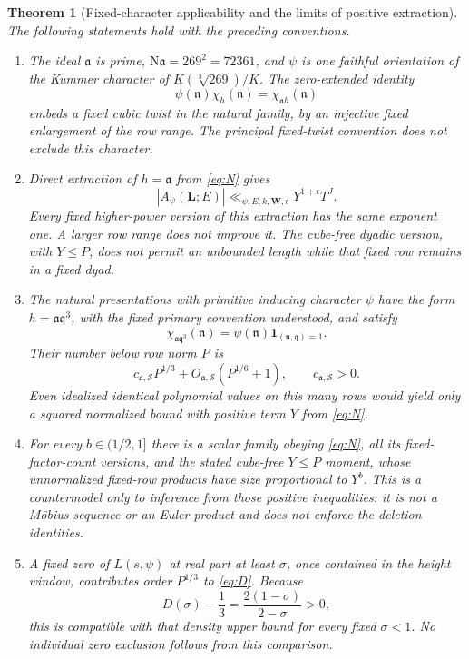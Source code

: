 \documentclass[11pt]{article}
\newtheorem{theorem}{Theorem}[section]
\theoremstyle{remark}\newtheorem{remark}[theorem]{Remark}
\newcommand{\N}{\mathrm N}
\begin{document}
\begin{theorem}[Fixed-character applicability and the limits of positive extraction]\label{thm:fixed}
The following statements hold with the preceding conventions.
\begin{enumerate}
\item The ideal $\mathfrak a$ is prime, $\N\mathfrak a=269^2=72361$, and $\psi$ is one faithful orientation of the Kummer character of $K(\sqrt[3]{269})/K$. The zero-extended identity
\[
\psi(\mathfrak n)\chi_h(\mathfrak n)=\chi_{\mathfrak a h}(\mathfrak n)
\]
embeds a fixed cubic twist in the natural family, by an injective fixed enlargement of the row range. The principal fixed-twist convention does not exclude this character.
\item Direct extraction of $h=\mathfrak a$ from \eqref{eq:N} gives
\[
|A_\psi(\mathbf L;E)|\ll_{\psi,E,k,\mathbf W,\epsilon}
Y^{1+\epsilon}T^J.
\]
Every fixed higher-power version of this extraction has the same exponent one. A larger row range does not improve it. The cube-free dyadic version, with $Y\le P$, does not permit an unbounded length while that fixed row remains in a fixed dyad.
\item The natural presentations with primitive inducing character $\psi$ have the form $h=\mathfrak a\mathfrak q^3$, with the fixed primary convention understood, and satisfy
\[
\chi_{\mathfrak a\mathfrak q^3}(\mathfrak n)
=\psi(\mathfrak n)\mathbf1_{(\mathfrak n,\mathfrak q)=1}.
\]
Their number below row norm $P$ is
\[
c_{\mathfrak a,\mathcal S}P^{1/3}+O_{\mathfrak a,\mathcal S}(P^{1/6}+1),
\qquad c_{\mathfrak a,\mathcal S}>0.
\]
Even idealized identical polynomial values on this many rows would yield only a squared normalized bound with positive term $Y$ from \eqref{eq:N}.
\item For every $b\in(1/2,1]$ there is a scalar family obeying \eqref{eq:N}, all its fixed-factor-count versions, and the stated cube-free $Y\le P$ moment, whose unnormalized fixed-row products have size proportional to $Y^b$. This is a countermodel only to inference from those positive inequalities: it is not a Möbius sequence or an Euler product and does not enforce the deletion identities.
\item A fixed zero of $L(s,\psi)$ at real part at least $\sigma$, once contained in the height window, contributes order $P^{1/3}$ to \eqref{eq:D}. Because
\[
D(\sigma)-\frac13=\frac{2(1-\sigma)}{2-\sigma}>0,
\]
this is compatible with that density upper bound for every fixed $\sigma<1$. No individual zero exclusion follows from this comparison.
\end{enumerate}
\end{theorem}
\end{document}
